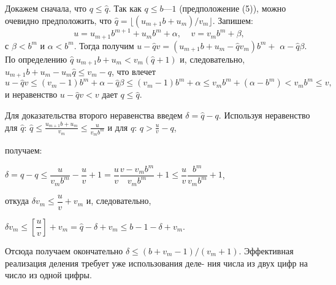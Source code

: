 Докажем сначала, что $q\leqslant\widehat{q}$. Так как $q\leqslant b — 1$ (предположение (5)),
можно очевидно предположить, что $\widehat{q}=\lfloor(u_{m+1}b+u_{m})/v_{m}\rfloor$. Запишем:
$$u=u_{m+1}b^{m+1}+u_{m}b^m+\alpha,\;\;\;\;v=v_{m}b^m+\beta,$$
с $\beta<b^m$ и $\alpha<b^m$. Тогда получим $u-\widehat{q}v=(u_{m+1}b+u_{m}-\widehat{q}v_{m})b^m+$\linebreak
$\alpha-\widehat{q}\beta$. По определению $\widehat{q}\;u_{m+1}b+u_{m}<v_{m}(\widehat{q}+1)$ и, следовательно, $u_{m+1}b+u_{m}-u_{m}\widehat{q}\leqslant v_{m}-q$, что влечет
$$u-\widehat{q}v\leqslant(v_{m}-1)b^m+\alpha-\widehat{q}\beta\leqslant(v_{m}-1)b^m+\alpha\leqslant v_{m}b^m+(\alpha-b^m)<v_{m}b^m\leqslant v,$$
и неравенство $u-\widehat{q}v<v$ дает $q\leqslant\widehat{q}$.

Для доказательства второго неравенства введем $\delta=\widehat{q}-q$. Используя неравенство для $\widehat{q}$: $\widehat{q}\leqslant\frac{u_{m+1}b+u_{m}}{v_{m}
}\leqslant\frac{u}{v_{m}b^m}$ и для $q$: $q>\frac{u}{v}-q$,
\newpage

\noindent
получаем:
\begin{center}
$\delta=\hat{q}-q\leqslant\dfrac{u}{v_mb^m}-\dfrac{u}{v}+1=\dfrac{u}{v}\dfrac{v-v_mb^m}{v_mb^m}+1\leqslant\dfrac{u}{v}\dfrac{b^m}{v_mb^m}+1$,
\end{center}
откуда $\delta{v_m\leqslant{\dfrac{u}{v}}+v_m}$ и, следовательно,
\begin{center}
$\delta{v_m}\leqslant\left[\dfrac{u}{v}\right]+v_m=\hat{q}-\delta+v_m\leqslant{b-1-\delta+v_m}$.
\end{center}
Отсюда получаем окончательно $\delta\leqslant(b+v_m-1)/(v_m+1)$.\newline
\hspace*{15pt}Эффективная реализация деления требует уже использования деле-\linebreak
ния числа из двух цифр на число из одной цифры.\\

